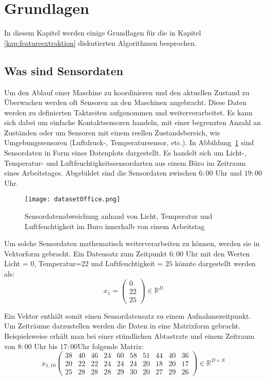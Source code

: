 \section{Grundlagen}\label{kap:grundlagen}
In diesem Kapitel werden einige Grundlagen für die in Kapitel \ref{kap:featureextraktion} diskutierten Algorithmen besprochen.
\subsection{Was sind Sensordaten}\label{kap:sensordaten}

Um den Ablauf einer Maschine zu koordinieren und den aktuellen Zustand zu Überwachen werden oft Sensoren an den Maschinen angebracht. 
Diese Daten werden zu definierten Taktzeiten aufgenommen und weiterverarbeitet. 
Es kann sich dabei um einfache Kontaktsensoren handeln, mit einer begrenzten Anzahl an Zuständen oder um Sensoren mit einem reellen Zustandsbereich, wie Umgebungssensoren (Luftdruck-, Temperatursensor, etc.). 
In Abbildung\ \ref{fig:datasetoffice} sind Sensordaten in Form eines Datenplots dargestellt. 
Es handelt sich um Licht-, Temperatur- und Luftfeuchtigkeitssensordarten aus einem Büro im Zeitraum eines Arbeitstages. 
Abgebildet sind die Sensordaten zwischen $6:00$ Uhr und $19:00$Uhr.
\begin{figure}
    \centering
    \texttt{[image: datasetOffice.png]}
    \caption{Sensordatenabweichung anhand von Licht, Temperatur und Luftfeuchtigkeit im Buro innerhalb von einem Arbeitstag~\cite{moraru2010using}}
    \label{fig:datasetoffice}
\end{figure}

Um solche Sensordaten mathematisch weiterverarbeiten zu können, werden sie in Vektorform gebracht.
Ein Datensatz zum Zeitpunkt $6:00$ Uhr mit den Werten Licht = $0$, Temperatur=$22$ und Luftfeuchtigkeit = $25$ könnte dargestellt werden als:
\begin{equation}
    x_1 =
  \begin{pmatrix}
      0\\
      22\\
      25
  \end{pmatrix}
  \in \mathbb{R}^D
\end{equation}

Ein Vektor enthält somit einen Sensordatensatz zu einem Aufnahmezeitpunkt. Um Zeiträume darzustellen werden die Daten in eine Matrixform gebracht. Beispielsweise erhält man bei einer stündlichen Abtastrate und einem Zeitraum von $8:00$ Uhr bis $17:00$Uhr folgende Matrix:
\begin{equation}
    x_{1,10}
    \begin{pmatrix}
       38 & 40 & 46 & 24 & 60 & 58 & 51 & 44 & 40 & 36\\
       20 & 22 & 22 & 24 & 24 & 24 & 20 & 18 & 20 & 17\\
       25 & 28 & 28 & 28 & 29 & 30 & 20 & 27 & 29 & 26
    \end{pmatrix}
    \in \mathbb{R}^{D \times N}
\end{equation}

